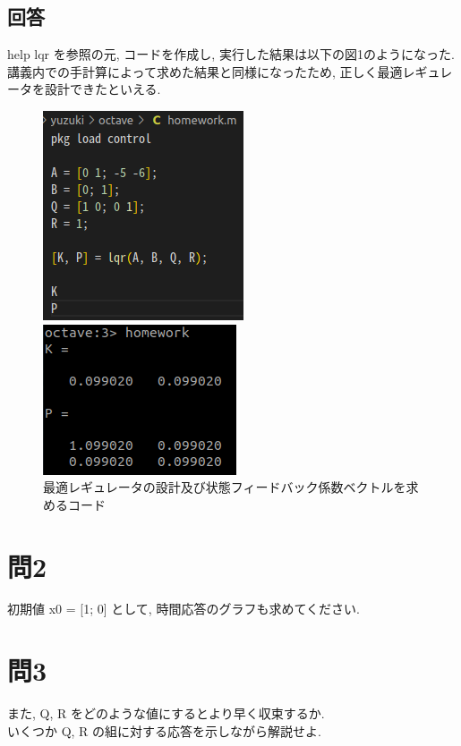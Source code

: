 \documentclass{jsarticle}
\begin{document}
\subsection*{回答}
help lqr を参照の元, コードを作成し, 実行した結果は以下の図1のようになった.\\
\hspace*{1zw}講義内での手計算によって求めた結果と同様になったため, 正しく最適レギュレータを設計できたといえる.
\begin{figure}[htbp]
  \begin{minipage}[t]{0.5\linewidth}
    \centering
    \includegraphics[keepaspectratio, scale=0.65]{fig/2.png}
  \end{minipage}
  \begin{minipage}[t]{0.5\linewidth}
    \centering
    \includegraphics[keepaspectratio, scale=0.90]{fig/1.png}
  \end{minipage}\vspace*{2mm}
  \caption{最適レギュレータの設計及び状態フィードバック係数ベクトルを求めるコード}
\end{figure}



\section*{問2}
初期値 x0 = [1; 0] として, 時間応答のグラフも求めてください.


\section*{問3}
また, Q, R をどのような値にするとより早く収束するか.\\
\hspace*{1zw}いくつか Q, R の組に対する応答を示しながら解説せよ.





\end{document}
